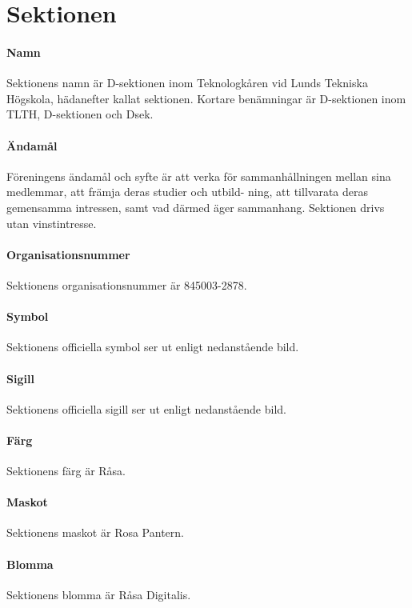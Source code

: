 \documentclass{dsekstatutes}
\begin{document}
\coverpage
\section{Sektionen}
\paragraph{Namn}
Sektionens namn är D-sektionen inom Teknologkåren vid Lunds Tekniska Högskola,
hädanefter kallat sektionen. Kortare benämningar är D-sektionen inom TLTH,
D-sektionen och Dsek.

\paragraph{Ändamål} \label{ändamål}
Föreningens ändamål och syfte är att verka för sammanhållningen mellan sina
medlemmar, att främja deras studier och utbild- ning, att tillvarata deras
gemensamma intressen, samt vad därmed äger sammanhang. Sektionen drivs utan
vinstintresse.

\paragraph{Organisationsnummer}
Sektionens organisationsnummer är 845003-2878.

\paragraph{Symbol}
Sektionens officiella symbol ser ut enligt nedanstående bild.

\Dsymbol[height=10mm]

\paragraph{Sigill}
Sektionens officiella sigill ser ut enligt nedanstående bild.

\Dseksigil[height=30mm, color]

\paragraph{Färg}
Sektionens färg är Råsa.

\paragraph{Maskot}
Sektionens maskot är Rosa Pantern.

\paragraph{Blomma}
Sektionens blomma är Råsa Digitalis.
\end{document}
